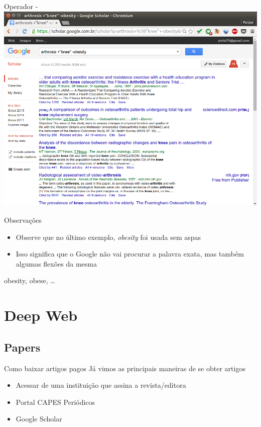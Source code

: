 \documentclass{beamer}
\begin{document}
\begin{frame}{Operador -}
  \includegraphics[height=.85\textheight]{Busca/google-fu-plusminus}
\end{frame}

\begin{frame}{Observações}
  \begin{itemize}
  \item Observe que no último exemplo, {\em obesity} foi usada sem
    aspas
  \item Isso significa que o Google não vai procurar a palavra
    \alert{exata}, mas também algumas flexões da mesma
  \end{itemize}
  \begin{example}
    obesity, obese, \ldots
  \end{example}
\end{frame}

\section{Deep Web}

\subsection{Papers}

\begin{frame}{Como baixar artigos pagos}
Já vimos as principais maneiras de se obter artigos
  \begin{itemize}
  \item Acessar de uma instituição que assina a revista/editora
  \item Portal CAPES Periódicos
  \item Google Scholar
  \end{itemize}
\end{frame}
\end{document}

